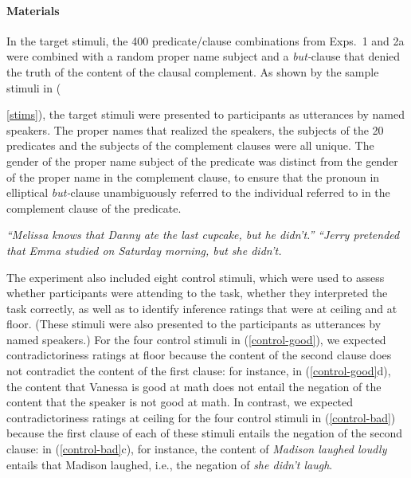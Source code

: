 \documentclass[11pt,fleqn]{article}
\newcommand{\6}{\mbox{$[\hspace*{-.6mm}[$}}
\newcommand{\9}{\mbox{$]\hspace*{-.6mm}]$}}
\begin{document}
\paragraph{Materials} In the target stimuli, the 400 predicate/clause combinations from Exps.~1 and 2a were combined with a random proper name subject and a {\em but-}clause that denied the truth of the content of the clausal complement. As shown by the sample stimuli in ({\ref{stims}), the target stimuli were presented to participants as utterances by named speakers. The proper names that realized the speakers, the subjects of the 20 predicates and the subjects of the complement clauses were all unique. The gender of the proper name subject of the predicate was distinct from the gender of the proper name in the complement clause, to ensure that the pronoun in elliptical {\em but-}clause unambiguously referred to the individual referred to in the complement clause of the predicate.

\begin{exe}
\ex\label{stims}
\begin{xlist}
 {\em ``Melissa knows that Danny ate the last cupcake, but he didn't.''}
 {\em ``Jerry pretended that Emma studied on Saturday morning, but she didn't.}
\end{xlist}
\end{exe}

The experiment also included eight control stimuli, which were used to assess whether participants were attending to the task, whether they interpreted the task correctly, as well as to identify inference ratings that were at ceiling and at floor. (These stimuli were also presented to the participants as utterances by named speakers.) For the four control stimuli in (\ref{control-good}), we expected contradictoriness ratings at floor because the content of the second clause does not contradict the content of the first clause: for instance, in (\ref{control-good}d), the content that Vanessa is good at math does not entail the negation of the content that the speaker is not good at math. In contrast, we expected contradictoriness ratings at ceiling for the four control stimuli in (\ref{control-bad}) because the first clause of each of these stimuli entails the negation of the second clause: in (\ref{control-bad}c), for instance, the content of {\em Madison laughed loudly} entails that Madison laughed, i.e., the negation of {\em she didn't laugh}.

}
\end{document}
